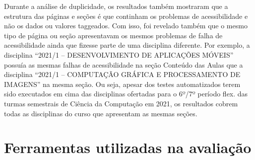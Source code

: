 \documentclass[
	12pt,				%
	openright,			%
	oneside,			%
	a4paper,			%
	chapter=TITLE,		%
	section=TITLE,		%
	subsection=TITLE,	%
	subsubsection=TITLE,%
	english,			%
	brazil				%
	]{abntex2}
\theoremstyle{definition}
\begin{document}
\pagebreak

Durante a análise de duplicidade, os resultados também mostraram que a estrutura das páginas e seções é que continham os problemas de acessibilidade e não os dados ou valores taggeados. Com isso, foi revelado também que o mesmo tipo de página ou seção apresentavam os mesmos problemas de falha de acessibilidade ainda que fizesse parte de uma disciplina diferente. Por exemplo, a disciplina “2021/1 – DESENVOLVIMENTO DE APLICAÇÕES MÓVEIS” possuía as mesmas falhas de acessibilidade na seção Conteúdo das Aulas que a disciplina “2021/1 – COMPUTAÇÃO GRÁFICA E PROCESSAMENTO DE IMAGENS” na mesma seção. Ou seja, apesar dos testes automatizados terem sido executados em cima das disciplinas ofertadas para o 6º/7º período flex. das turmas semestrais de Ciência da Computação em 2021, os resultados cobrem todas as disciplinas do curso que apresentam as mesmas seções.

\pagebreak

\section{Ferramentas utilizadas na avaliação}
\end{document}
